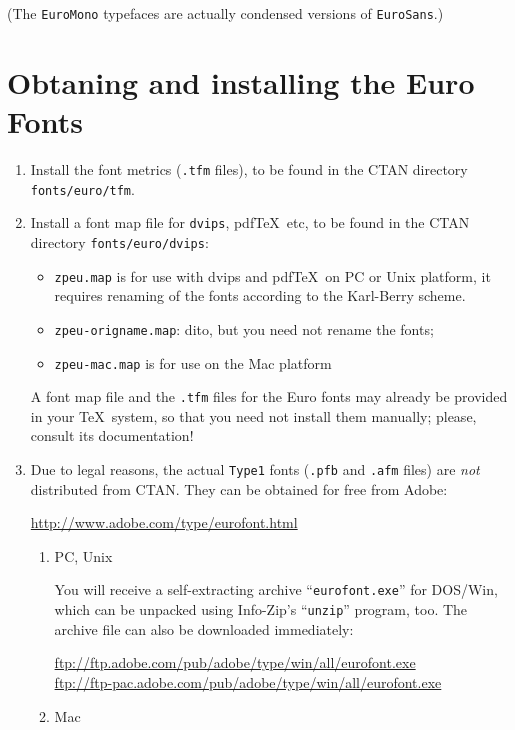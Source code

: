 \documentclass[DIV=9, pagesize=auto]{scrartcl}
\newcommand*{\pkg}[1]{\textsf{#1}}
\begin{document}
\medskip
\noindent
(The \texttt{EuroMono} typefaces are actually condensed versions of
\texttt{EuroSans}.)


\section{Obtaning and installing the Euro Fonts}

\renewcommand*{\labelenumi}{(\theenumi)}

\begin{enumerate}
\item Install the font metrics (\texttt{.tfm} files), to be found in
  the CTAN directory \texttt{fonts/euro/tfm}.
  
\item Install a font map file for \texttt{dvips}, pdf\TeX\ etc, to be found
  in the CTAN directory \texttt{fonts/euro/dvips}:
  \begin{itemize}
  \item \texttt{zpeu.map} is for use with dvips and pdf\TeX\ on PC or Unix
    platform, it requires renaming of the fonts according to 
    the Karl-Berry scheme.
  \item \texttt{zpeu-origname.map}: dito, but you need not rename the fonts;
  \item \texttt{zpeu-mac.map} is for use on the Mac platform
  \end{itemize}
  
  A font map file and the \texttt{.tfm} files for the \pkg{Euro} fonts may
  already be provided in your \TeX\ system, so that you need not
  install them manually; please, consult its documentation!

\item Due to legal reasons, the actual \texttt{Type1} fonts (\texttt{.pfb} and
  \texttt{.afm} files) are \emph{not} distributed from CTAN\@.  They can be
  obtained for free from Adobe:

  \url{http://www.adobe.com/type/eurofont.html}

  \begin{enumerate}
  \item PC, Unix
  
    You will receive a self-extracting archive ``\texttt{eurofont.exe}'' for
    DOS/Win, which can be unpacked using Info-Zip's ``\texttt{unzip}''
    program, too.  The archive file can also be downloaded
    immediately:

    \url{ftp://ftp.adobe.com/pub/adobe/type/win/all/eurofont.exe}\\
    \url{ftp://ftp-pac.adobe.com/pub/adobe/type/win/all/eurofont.exe}
  \item Mac
  

\end{enumerate}
\end{enumerate}
\end{document}
